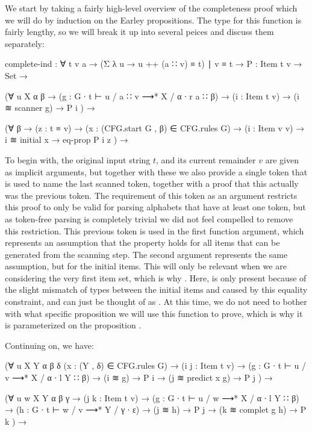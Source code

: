 		We start by taking a fairly high-level overview of the completeness
		proof which we will do by induction on the Earley propositions. The
		type for this function is fairly lengthy, so we will break it up into
		several peices and discuss them separately:

		\begin{code}
			complete-ind : ∀ {t v a} →
			  (Σ λ u → u ++ (a ∷ v) ≡ t) ∣ v ≡ t →
			  {P : Item t v → Set} →

			  (∀ {u X α β} →
			    (g : G ∙ t ⊢ u / a ∷ v ⟶* X / α ∙ r a ∷ β) →
			    (i : Item t v) → (i ≋ scanner g) →
			    P i
			  ) →

			  (∀ {β} →
			    (z : t ≡ v) →
			    (x : (CFG.start G , β) ∈ CFG.rules G) →
			    (i : Item v v) →
			    i ≋ initial x → eq-prop P i z
			  ) →
		\end{code}

		To begin with, the original input string $t$, and its current remainder
		$v$ are given as implicit arguments, but together with these we also
		provide a single token that is used to name the last scanned token,
		together with a proof that this actually was the previous token.  The
		requirement of this token as an argument restricts this proof to only
		be valid for parsing alphabets that have at least one token, but as
		token-free parsing is completely trivial we did not feel compelled to
		remove this restriction. This previous token is used in the first
		function argument, which represents an assumption that the property
		 holds for all items that can be generated from the scanning
		step. The second argument represents the same assumption, but for the
		initial items. This will only be relevant when we are considering the
		very first item set, which is why . Here,
		 is only present because of the slight mismatch of
		types between the initial items and  caused by this equality
		constraint, and can just be thought of as . At this time,
		we do not need to bother with what specific proposition we will use
		this function to prove, which is why it is parameterized on the
		proposition .

		Continuing on, we have:

		\begin{code}
			  (∀ {u X Y α β δ} (x : (Y , δ) ∈ CFG.rules G) →
			    (i j : Item t v) →
			    (g : G ∙ t ⊢ u / v ⟶* X / α ∙ l Y ∷ β) →
			    (i ≋ g) → P i →
			    (j ≋ predict x g) → P j
			  ) →

			  (∀ {u w X Y α β γ} →
			    (j k : Item t v) →
			    (g : G ∙ t ⊢ u / w ⟶* X / α ∙ l Y ∷ β) →
			    (h : G ∙ t ⊢ w / v ⟶* Y / γ ∙ ε) →
			    (j ≋ h) → P j →
			    (k ≋ complet g h) → P k
			  ) →
		\end{code}

